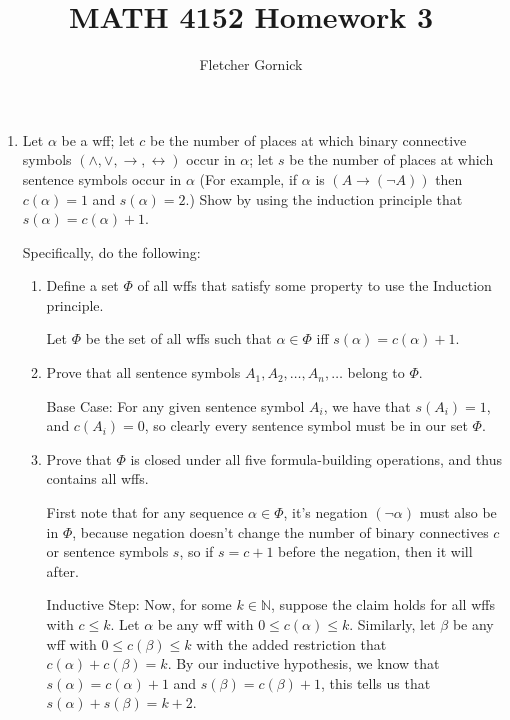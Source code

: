 \documentclass[11pt]{article}
\newcommand{\N}{\mathbb{N}}
\newcommand{\n}{\vspace{0.5cm}}
\begin{document}
\title{\vspace{-1.5cm}MATH 4152 Homework 3}
  \author{Fletcher Gornick}
  \maketitle
  \begin{enumerate}
    \item Let \(\alpha\) be a wff; let \(c\) be the number of places at which binary connective symbols \((\wedge, \vee, \to, \leftrightarrow)\) occur in \(\alpha\); let \(s\) be the number of places at which sentence symbols occur in \(\alpha\) (For example, if \(\alpha\) is \((A \to (\neg A))\) then \(c(\alpha) = 1\) and \(s(\alpha) = 2\).)  Show by using the induction principle that \(s(\alpha) = c(\alpha)+1\).

      Specifically, do the following: 
      \begin{enumerate}[label=(\alph*)]
        \item Define a set \(\varPhi\) of all wffs that satisfy some property to use the Induction principle. \n

          Let \(\varPhi\) be the set of all wffs such that \(\alpha \in \varPhi\) iff \(s(\alpha) = c(\alpha) + 1\). \n

        \item Prove that all sentence symbols \(A_1,A_2,\hdots,A_n,\hdots\) belong to \(\varPhi\). \n

          Base Case: For any given sentence symbol \(A_i\), we have that \(s(A_i) = 1\), and \(c(A_i) = 0\), so clearly every sentence symbol must be in our set \(\varPhi\). \n
        \item Prove that \(\varPhi\) is closed under all five formula-building operations, and thus contains all wffs. \n

          First note that for any sequence \(\alpha \in \varPhi\), it's negation \((\neg \alpha)\) must also be in \(\varPhi\), because negation doesn't change the number of binary connectives \(c\) or sentence symbols \(s\), so if \(s = c+1\) before the negation, then it will after. \n

          Inductive Step: Now, for some \(k \in \N\), suppose the claim holds for all wffs with \(c \leq k\).  Let \(\alpha\) be any wff with \(0 \leq c(\alpha) \leq k\).  Similarly, let \(\beta\) be any wff with \(0 \leq c(\beta) \leq k\) with the added restriction that \(c(\alpha) + c(\beta) = k\).  By our inductive hypothesis, we know that \(s(\alpha) = c(\alpha) + 1\) and \(s(\beta) = c(\beta) + 1\), this tells us that \(s(\alpha) + s(\beta) = k + 2\).\n


\end{enumerate}
\end{enumerate}
\end{document}
